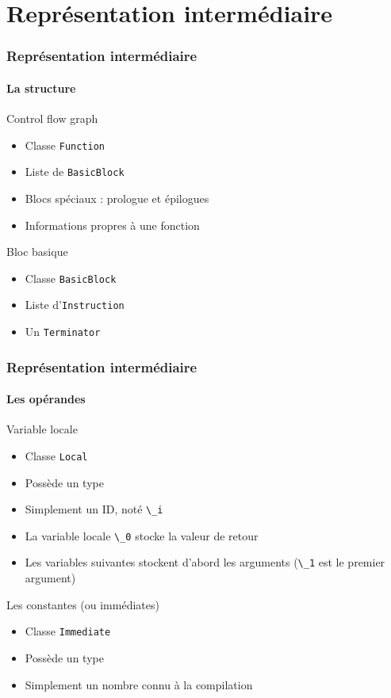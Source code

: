 \documentclass{beamer}
\newcommand*{\local}[1]{\lstinline|\_#1|}
\begin{document}
\section{Représentation intermédiaire}

\begin{frame}
    \frametitle{Représentation intermédiaire}
    \framesubtitle{La structure}

    \begin{block}{Control flow graph}
        \begin{itemize}
            \item Classe \lstinline{Function}
            \item Liste de \lstinline{BasicBlock}
            \item Blocs spéciaux : prologue et épilogues
            \item Informations propres à une fonction
        \end{itemize}
    \end{block}
    \pause
    \begin{block}{Bloc basique}
        \begin{itemize}
            \item Classe \lstinline{BasicBlock}
            \item Liste d'\lstinline{Instruction}
            \item Un \lstinline{Terminator}
        \end{itemize}
    \end{block}
\end{frame}

\begin{frame}
    \frametitle{Représentation intermédiaire}
    \framesubtitle{Les opérandes}
    \begin{block}{Variable locale}
        \begin{itemize}
            \item Classe \lstinline{Local}
            \item Possède un type
            \item Simplement un ID, noté \local{i}
            \item La variable locale \local{0} stocke la valeur de retour
            \item Les variables suivantes stockent d'abord les arguments (\local{1} est le premier argument)
        \end{itemize}
    \end{block}
    \pause
    \begin{block}{Les constantes (ou immédiates)}
        \begin{itemize}
            \item Classe \lstinline{Immediate}
            \item Possède un type
            \item Simplement un nombre connu à la compilation
        \end{itemize}
    \end{block}
\end{frame}
\end{document}
